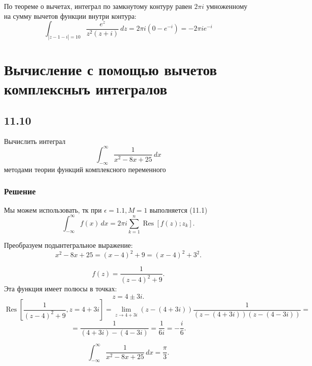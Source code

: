 \documentclass[12pt,a4paper]{article}
\begin{document}
По теореме о вычетах, интеграл по замкнутому контуру равен \(2\pi i\) умноженному на сумму вычетов функции внутри контура:
\[
\int_{|z - 1 - i| = 10} \frac{e^z}{z^2(z + i)} \, dz = 2\pi i \left( 0 - e^{-i} \right) = -2\pi i e^{-i}
\]
\section{Вычисление с помощью вычетов комплексныъ интегралов}
\subsection*{11.10}
Вычислить интеграл
\[
\int_{-\infty}^{\infty} \frac{1}{x^2 - 8x + 25} \, dx
\]
методами теории функций комплексного переменного
\subsubsection*{Решение}
Мы можем использовать, тк при $\epsilon=1.1,M=1$ выполняется (11.1)
\[
\int_{-\infty}^{\infty} f(x) \, dx = 2\pi i \sum_{k=1}^n \operatorname{Res} \left[ f(z); z_k \right].
\]

Преобразуем подынтегральное выражение:
\[
x^2 - 8x + 25 = (x - 4)^2 + 9 = (x - 4)^2 + 3^2.
\]

\[
f(z) = \frac{1}{(z - 4)^2 + 9}.
\]
Эта функция имеет полюсы в точках:
\[
z = 4 \pm 3i.
\]
\[
\operatorname{Res}\left[ \frac{1}{(z - 4)^2 + 9}, z = 4 + 3i \right] = \lim_{z \to 4 + 3i} (z - (4 + 3i)) \frac{1}{(z - (4 + 3i))(z - (4 - 3i))}=\]
\[
= \frac{1}{(4 + 3i) - (4 - 3i)} = \frac{1}{6i} = -\frac{i}{6}.
\]

\[
\int_{-\infty}^{\infty} \frac{1}{x^2 - 8x + 25} \, dx = \frac{\pi}{3}.
\]
\end{document}
